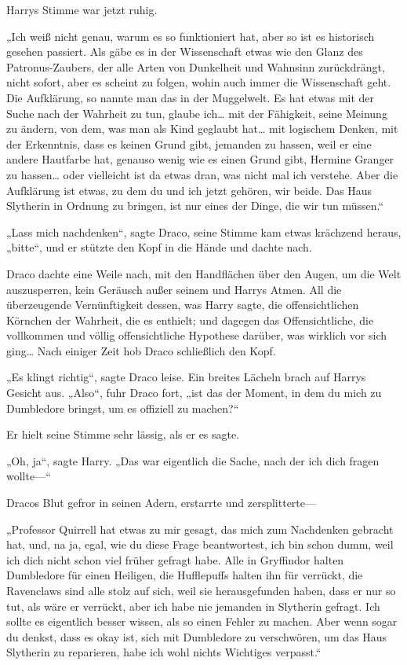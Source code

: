 {Harrys Stimme war jetzt ruhig.

„Ich weiß nicht genau, warum es so funktioniert hat, aber so ist es historisch gesehen passiert. Als gäbe es in der Wissenschaft etwas wie den Glanz des Patronus-Zaubers, der alle Arten von Dunkelheit und Wahnsinn zurückdrängt, nicht sofort, aber es scheint zu folgen, wohin auch immer die Wissenschaft geht. Die Aufklärung, so nannte man das in der Muggelwelt. Es hat etwas mit der Suche nach der Wahrheit zu tun, glaube ich… mit der Fähigkeit, seine Meinung zu ändern, von dem, was man als Kind geglaubt hat… mit logischem Denken, mit der Erkenntnis, dass es keinen Grund gibt, jemanden zu hassen, weil er eine andere Hautfarbe hat, genauso wenig wie es einen Grund gibt, Hermine Granger zu hassen… oder vielleicht ist da etwas dran, was nicht mal ich verstehe. Aber die Aufklärung ist etwas, zu dem du und ich jetzt gehören, wir beide. Das Haus Slytherin in Ordnung zu bringen, ist nur eines der Dinge, die wir tun müssen.“

„Lass mich nachdenken“, sagte Draco, seine Stimme kam etwas krächzend heraus, „bitte“, und er stützte den Kopf in die Hände und dachte nach.

Draco dachte eine Weile nach, mit den Handflächen über den Augen, um die Welt auszusperren, kein Geräusch außer seinem und Harrys Atmen. All die überzeugende Vernünftigkeit dessen, was Harry sagte, die offensichtlichen Körnchen der Wahrheit, die es enthielt; und dagegen das Offensichtliche, die vollkommen und völlig offensichtliche Hypothese darüber, was wirklich vor sich ging… Nach einiger Zeit hob Draco schließlich den Kopf.

„Es klingt richtig“, sagte Draco leise. Ein breites Lächeln brach auf Harrys Gesicht aus. „Also“, fuhr Draco fort, „ist das der Moment, in dem du mich zu Dumbledore bringst, um es offiziell zu machen?“

Er hielt seine Stimme sehr lässig, als er es sagte.

„Oh, ja“, sagte Harry. „Das war eigentlich die Sache, nach der ich dich fragen wollte—“

Dracos Blut gefror in seinen Adern, erstarrte und zersplitterte—

„Professor Quirrell hat etwas zu mir gesagt, das mich zum Nachdenken gebracht hat, und, na ja, egal, wie du diese Frage beantwortest, ich bin schon dumm, weil ich dich nicht schon viel früher gefragt habe. Alle in Gryffindor halten Dumbledore für einen Heiligen, die Hufflepuffs halten ihn für verrückt, die Ravenclaws sind alle stolz auf sich, weil sie herausgefunden haben, dass er nur so tut, als wäre er verrückt, aber ich habe nie jemanden in Slytherin gefragt. Ich sollte es eigentlich besser wissen, als so einen Fehler zu machen. Aber wenn sogar du denkst, dass es okay ist, sich mit Dumbledore zu verschwören, um das Haus Slytherin zu reparieren, habe ich wohl nichts Wichtiges verpasst.“

}
